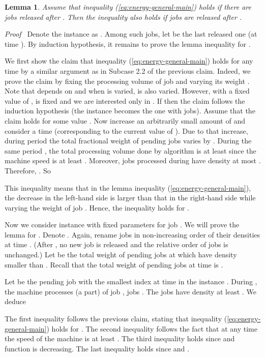 \documentclass[11pt]{article}
\newenvironment{proof}{\noindent\emph{Proof\ }}{\hspace*{\fill}\medskip}
\newtheorem{lemma}{Lemma}
\begin{document}
\begin{lemma}		\label{lem:induction}
Assume that inequality (\ref{eq:energy-general-main}) holds if 
there are  jobs released after . Then the inequality also holds
if  jobs are released after .
\end{lemma}
\begin{proof}
Denote the instance as .
Among such jobs, let  be the last released one (at time ).
By induction hypothesis, it remains to prove the lemma inequality for .

We first show the claim that inequality (\ref{eq:energy-general-main}) holds for any time 
 by a similar argument as in Subcase 2.2 of the previous claim. 
Indeed, we prove the claim by fixing the 
processing volume of job  and varying its weight . Note that 
 depends on  and when  is varied, 
 is also varied. However, with a fixed value of 
,  is fixed and 
we are interested only in . If  then 
the claim follows the induction hypothesis (the instance becomes the one 
with  jobs).  Assume that the claim holds for some value .
Now increase an arbitrarily small amount of  and 
consider a time  (corresponding to the current value of ).
Due to that increase, during period  the total fractional weight of pending jobs 
varies by . During the same period ,
the total processing volume done by algorithm is at least
 since the machine speed is at least .
Moreover, jobs processed during  have density at most .
Therefore, .    
So 

This inequality means that in the lemma inequality (\ref{eq:energy-general-main}), 
the decrease in the left-hand side 
is larger than that in the right-hand side while varying the weight of job . 
Hence, the inequality holds for .



Now we consider instance  with fixed parameters for job .
We will prove the lemma for .
Denote . Again, rename jobs 
in non-increasing order of their  densities at time .
(After , no new job is released and the relative order of jobs is unchanged.)
Let  be the total weight of pending jobs at 
which have  density smaller than . 
Recall that the total weight of pending jobs at time  is .

Let  be the pending job with the smallest index at time  
in the instance . 
During , the machine processes (a part) of job , jobs .
The jobs have density at least .
We deduce

The first inequality follows the previous claim, stating that inequality (\ref{eq:energy-general-main}) 
holds for . The second inequality follows the fact that at any time the speed 
of the machine is at least . The third inequality
holds since 
and function  is decreasing.
The last inequality holds since  and .
\end{proof}
\end{document}
